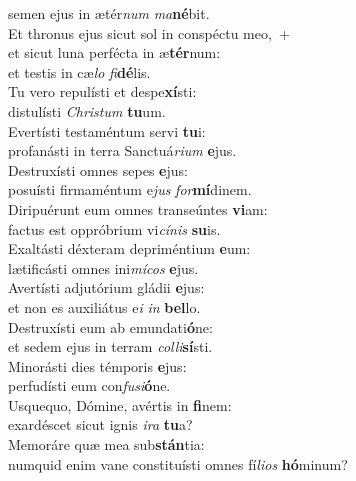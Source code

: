 \oddverse semen ejus in ætér\textit{num} \textit{ma}\textbf{né}bit.\\
\evenverse Et thronus ejus sicut sol in conspéctu meo,~+\\
\evenverse  et sicut luna perfécta in æ\textbf{tér}num:~\*\\
\evenverse et testis in cæ\textit{lo} \textit{fi}\textbf{dé}lis.\\
\oddverse Tu vero repulísti et despe\textbf{xí}sti:~\*\\
\oddverse distulísti \textit{Chri}\textit{stum} \textbf{tu}um.\\
\evenverse Evertísti testaméntum servi \textbf{tu}i:~\*\\
\evenverse profanásti in terra Sanctuá\textit{ri}\textit{um} \textbf{e}jus.\\
\oddverse Destruxísti omnes sepes \textbf{e}jus:~\*\\
\oddverse posuísti firmaméntum e\textit{jus} \textit{for}\textbf{mí}dinem.\\
\evenverse Diripuérunt eum omnes transeúntes \textbf{vi}am:~\*\\
\evenverse factus est oppróbrium vi\textit{cí}\textit{nis} \textbf{su}is.\\
\oddverse Exaltásti déxteram depriméntium \textbf{e}um:~\*\\
\oddverse lætificásti omnes ini\textit{mí}\textit{cos} \textbf{e}jus.\\
\evenverse Avertísti adjutórium gládii \textbf{e}jus:~\*\\
\evenverse et non es auxiliátus e\textit{i} \textit{in} \textbf{bel}lo.\\
\oddverse Destruxísti eum ab emundati\textbf{ó}ne:~\*\\
\oddverse et sedem ejus in terram \textit{col}\textit{li}\textbf{sí}sti.\\
\evenverse Minorásti dies témporis \textbf{e}jus:~\*\\
\evenverse perfudísti eum con\textit{fu}\textit{si}\textbf{ó}ne.\\
\oddverse Usquequo, Dómine, avértis in \textbf{fi}nem:~\*\\
\oddverse exardéscet sicut ignis \textit{i}\textit{ra} \textbf{tu}a?\\
\evenverse Memoráre quæ mea sub\textbf{stán}tia:~\*\\
\evenverse numquid enim vane constituísti omnes fí\textit{li}\textit{os} \textbf{hó}minum?\\
